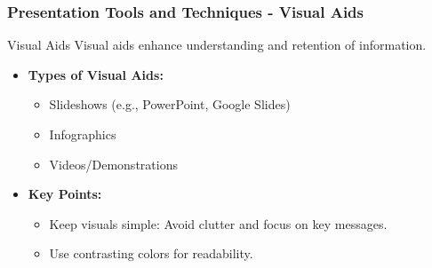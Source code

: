 \documentclass[aspectratio=169]{beamer}
\begin{document}
\begin{frame}[fragile]
    \frametitle{Presentation Tools and Techniques - Visual Aids}
    \begin{block}{Visual Aids}
        Visual aids enhance understanding and retention of information.
        \begin{itemize}
            \item \textbf{Types of Visual Aids:}
            \begin{itemize}
                \item Slideshows (e.g., PowerPoint, Google Slides)
                \item Infographics
                \item Videos/Demonstrations
            \end{itemize}
            
            \item \textbf{Key Points:}
            \begin{itemize}
                \item Keep visuals simple: Avoid clutter and focus on key messages.
                \item Use contrasting colors for readability.
            \end{itemize}
        \end{itemize}
    \end{block}
\end{frame}
\end{document}
